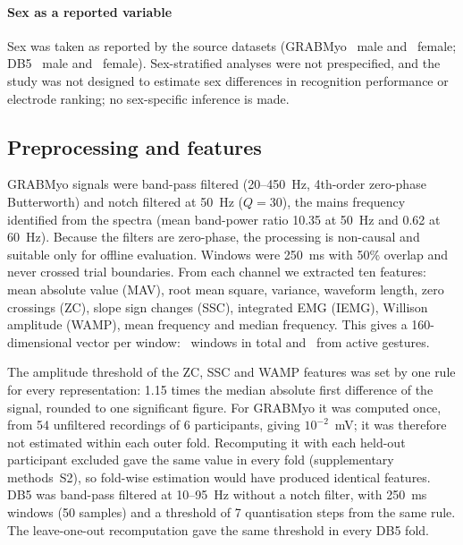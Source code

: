 \paragraph{Sex as a reported variable}
Sex was taken as reported by the source datasets (GRABMyo \GRABMyoMale\ male and \GRABMyoFemale\ female; DB5 \DBFiveMale\ male and \DBFiveFemale\ female). Sex-stratified analyses were not prespecified, and the study was not designed to estimate sex differences in recognition performance or electrode ranking; no sex-specific inference is made.

\subsection{Preprocessing and features}
\label{sec:preprocessing}
GRABMyo signals were band-pass filtered (20--450~Hz, 4th-order zero-phase Butterworth) and notch filtered at 50~Hz ($Q = 30$), the mains frequency identified from the spectra (mean band-power ratio 10.35 at 50~Hz and 0.62 at 60~Hz). Because the filters are zero-phase, the processing is non-causal and suitable only for offline evaluation. Windows were 250~ms with 50\% overlap and never crossed trial boundaries. From each channel we extracted ten features: mean absolute value (MAV), root mean square, variance, waveform length, zero crossings (ZC), slope sign changes (SSC), integrated EMG (IEMG), Willison amplitude (WAMP), mean frequency and median frequency. This gives a 160-dimensional vector per window: \GRABMyoWindows\ windows in total and \GRABMyoActiveWindows\ from active gestures.

The amplitude threshold of the ZC, SSC and WAMP features was set by one rule for every representation: 1.15 times the median absolute first difference of the signal, rounded to one significant figure. For GRABMyo it was computed once, from 54 unfiltered recordings of 6 participants, giving $10^{-2}$~mV; it was therefore not estimated within each outer fold. Recomputing it with each held-out participant excluded gave the same value in every fold (supplementary methods~S2), so fold-wise estimation would have produced identical features.
DB5 was band-pass filtered at 10--95~Hz without a notch filter, with 250~ms windows (50 samples) and a threshold of 7 quantisation steps from the same rule. The leave-one-out recomputation gave the same threshold in every DB5 fold.

